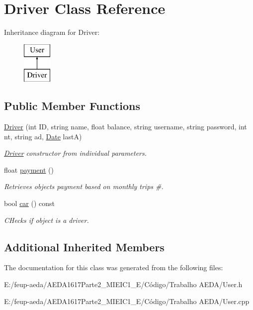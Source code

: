 \hypertarget{class_driver}{}\section{Driver Class Reference}
\label{class_driver}
Inheritance diagram for Driver\+:\begin{figure}[H]
\begin{center}
\leavevmode
\includegraphics[height=2.000000cm]{class_driver}
\end{center}
\end{figure}
\subsection*{Public Member Functions}
\begin{DoxyCompactItemize}
\item 
\hyperlink{group___user_ga781d40c6af9f399284149602ead32171}{Driver} (int ID, string name, float balance, string username, string password, int nt, string ad, \hyperlink{class_date}{Date} lastA)
\begin{DoxyCompactList}\small\item\em \hyperlink{class_driver}{Driver} constructor from individual parameters. \end{DoxyCompactList}\item 
float \hyperlink{group___user_ga3e6ec3270b94d43b3865b326e5bcd381}{payment} ()
\begin{DoxyCompactList}\small\item\em Retrieves object\textquotesingle{}s payment based on monthly trips \#. \end{DoxyCompactList}\item 
bool \hyperlink{group___user_gaf8b79bce2879830b12e6f3ec954192a2}{car} () const
\begin{DoxyCompactList}\small\item\em C\+Hecks if object is a driver. \end{DoxyCompactList}\end{DoxyCompactItemize}
\subsection*{Additional Inherited Members}


The documentation for this class was generated from the following files\+:\begin{DoxyCompactItemize}
\item 
E\+:/feup-\/aeda/\+A\+E\+D\+A1617\+Parte2\+\_\+M\+I\+E\+I\+C1\+\_\+\+E/\+Código/\+Trabalho A\+E\+D\+A/User.\+h\item 
E\+:/feup-\/aeda/\+A\+E\+D\+A1617\+Parte2\+\_\+M\+I\+E\+I\+C1\+\_\+\+E/\+Código/\+Trabalho A\+E\+D\+A/User.\+cpp\end{DoxyCompactItemize}
